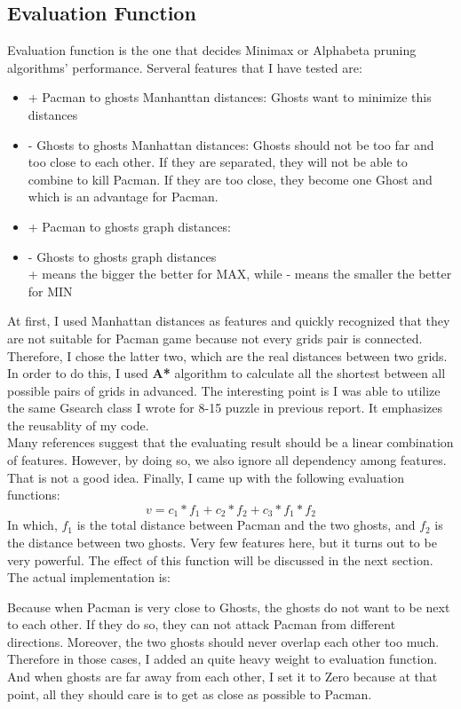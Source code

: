 \documentclass[a4paper, 11pt]{article}
\begin{document}
\subsection{Evaluation Function}
Evaluation function is the one that decides Minimax or Alphabeta pruning algorithms' performance. Serveral features that I have tested are:
\begin{itemize}
\item{+} Pacman to ghosts Manhanttan distances: Ghosts want to minimize this distances
\item{-} Ghosts to ghosts Manhattan distances: Ghosts should not be too far and too close to each other. If they are separated, they will not be able to combine to kill Pacman. If they are too close, they become one Ghost and which is an advantage for Pacman.
\item{+} Pacman to ghosts graph distances:
\item{-} Ghosts to ghosts graph distances \\
  + means the bigger the better for MAX, while - means the smaller the better for MIN
\end{itemize}
At first, I used Manhattan distances as features and quickly recognized that they are not suitable for Pacman game because not every grids pair is connected. Therefore, I chose the latter two, which are the real distances between two grids. In order to do this, I used \textbf{A*} algorithm to calculate all the shortest between all possible pairs of grids in advanced. The interesting point is I was able to utilize the same Gsearch class I wrote for 8-15 puzzle in previous report. It emphasizes the reusablity of my code. \\
Many references suggest that the evaluating result should be a linear combination of features. However, by doing so, we also ignore all dependency among features. That is not a good idea. Finally, I came up with the following evaluation functions: 
\[ v = c_1*f_1+c_2*f_2+c_3*f_1*f_2\]
In which, $f_1$ is the total distance between Pacman and the two ghosts, and $f_2$ is the distance between two ghosts. Very few features here, but it turns out to be very powerful. The effect of this function will be discussed in the next section. \\
The actual implementation is:


Because when Pacman is very close to Ghosts, the ghosts do not want to be next to each other. If they do so, they can not attack Pacman from different directions. Moreover, the two ghosts should never overlap each other too much. Therefore in those cases, I added an quite heavy weight to evaluation function. And when ghosts are far away from each other, I set it to Zero because at that point, all they should care is to get as close as possible to Pacman. 
\newpage
\end{document}
